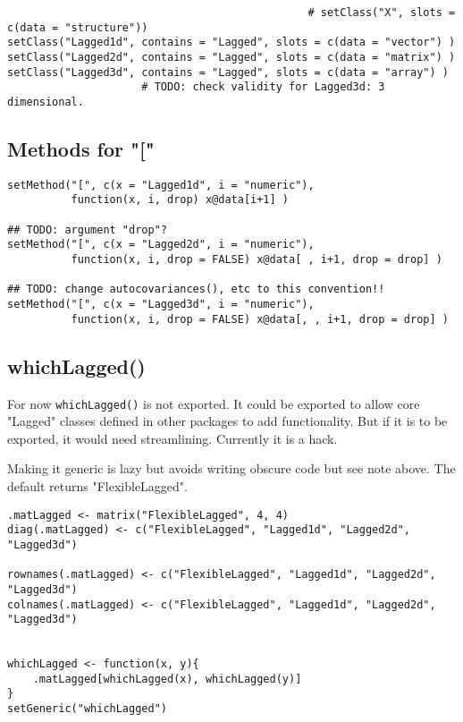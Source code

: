 \documentclass[11pt,a4paper]{article}
\begin{document}
\begin{verbatim}
                                               # setClass("X", slots = c(data = "structure"))
setClass("Lagged1d", contains = "Lagged", slots = c(data = "vector") )
setClass("Lagged2d", contains = "Lagged", slots = c(data = "matrix") )
setClass("Lagged3d", contains = "Lagged", slots = c(data = "array") )
                     # TODO: check validity for Lagged3d: 3 dimensional.
\end{verbatim}


\subsection{Methods for "["}
\label{sec:org49ffca1}

\begin{verbatim}
setMethod("[", c(x = "Lagged1d", i = "numeric"),
          function(x, i, drop) x@data[i+1] )

## TODO: argument "drop"?
setMethod("[", c(x = "Lagged2d", i = "numeric"),
          function(x, i, drop = FALSE) x@data[ , i+1, drop = drop] )

## TODO: change autocovariances(), etc to this convention!!
setMethod("[", c(x = "Lagged3d", i = "numeric"),
          function(x, i, drop = FALSE) x@data[, , i+1, drop = drop] )
\end{verbatim}

\subsection{whichLagged()}
\label{sec:org99d682b}

For now \texttt{whichLagged()} is not exported. It could be exported to allow core "Lagged" classes
defined in other packages to add functionality. But if it is to be exported, it would need
streamlining. Currently it is a hack.

Making it generic is lazy but avoids writing obscure code but see note above.
The default returns "FlexibleLagged".
\begin{verbatim}
.matLagged <- matrix("FlexibleLagged", 4, 4)
diag(.matLagged) <- c("FlexibleLagged", "Lagged1d", "Lagged2d", "Lagged3d")

rownames(.matLagged) <- c("FlexibleLagged", "Lagged1d", "Lagged2d", "Lagged3d")
colnames(.matLagged) <- c("FlexibleLagged", "Lagged1d", "Lagged2d", "Lagged3d")


whichLagged <- function(x, y){
    .matLagged[whichLagged(x), whichLagged(y)]
}
setGeneric("whichLagged")
\end{verbatim}
\end{document}
